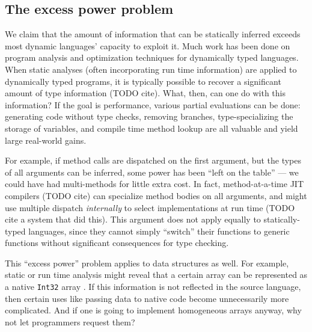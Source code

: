 

\subsection{The excess power problem}

We claim that the amount of information that can be statically inferred
exceeds most dynamic languages' capacity to exploit it.
Much work has been done on program analysis and optimization techniques
for dynamically typed languages.
When static analyses (often incorporating run time information) are applied
to dynamically typed programs, it is typically possible to recover a
significant amount of type information (TODO cite). 
What, then, can one do with this information?
If the goal is performance, various partial evaluations can be done:
generating code without type checks, removing branches, type-specializing
the storage of variables, and compile time method lookup are all valuable
and yield large real-world gains.

For example,
if method calls are dispatched on the first argument, but the types of all
arguments can be inferred, some power has been ``left on the table'' ---
we could have had multi-methods for little extra cost. In fact, method-at-a-time
JIT compilers (TODO cite)  can specialize method bodies on all arguments,
and might use multiple dispatch \emph{internally} to select implementations
at run time (TODO  cite a system that did this).
This argument does not apply equally to statically-typed languages, since they
cannot simply ``switch'' their functions to generic functions without significant
consequences for type checking.

This ``excess power'' problem applies to data structures as well.
For example, static or run time analysis might reveal that a certain array
can be represented as a native \texttt{Int32} array \cite{Bolz2013}.
If this information is not reflected in the source language, then
certain uses like passing data to native code become unnecessarily more
complicated.
And if one is going to implement homogeneous arrays anyway, why not
let programmers request them?

